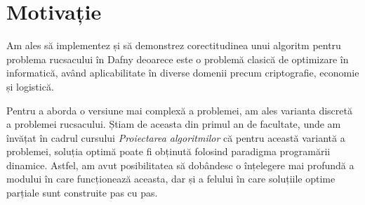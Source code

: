 \chapter*{Motivație} 

Am ales să implementez și să demonstrez corectitudinea unui algoritm pentru problema rucsacului în Dafny deoarece este o problemă clasică de optimizare în informatică, având aplicabilitate în diverse domenii precum criptografie, economie și logistică. \par 
Pentru a aborda o versiune mai complexă a problemei, am ales varianta discretă a problemei rucsacului. Știam de aceasta din primul an de facultate, unde am învățat în cadrul cursului \emph{Proiectarea algoritmilor} că pentru această variantă a problemei, soluția optimă poate fi obținută folosind paradigma programării dinamice. Astfel, am avut posibilitatea să dobândesc o înțelegere mai profundă a modului în care funcționează aceasta, dar și a felului în care soluțiile optime parțiale sunt construite pas cu pas.